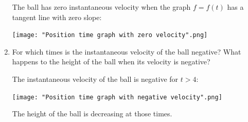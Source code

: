 \documentclass[nooutcomes]{ximera}
\begin{document}
\begin{problem}
\begin{enumerate}
		\begin{freeResponse}		 
		 The ball has zero instantaneous velocity when the graph $f=f(t)$  has a tangent line with zero slope:
        \begin{image}
          \texttt{[image: "Position time graph with zero velocity".png]}
        \end{image}
		\end{freeResponse}
		
		
		
		\item  For which times is the instantaneous velocity of the ball negative?
      What happens to the height of the ball when its velocity is negative?
      \begin{freeResponse}
        The instantaneous velocity of the ball is negative for $t > 4$:
        \begin{image}
          \texttt{[image: "Position time graph with negative velocity".png]}
        \end{image}
        The height of the ball is decreasing at those times.
      \end{freeResponse}
			
		\end{enumerate}
			
\end{problem}
	
								
				
\end{document}
